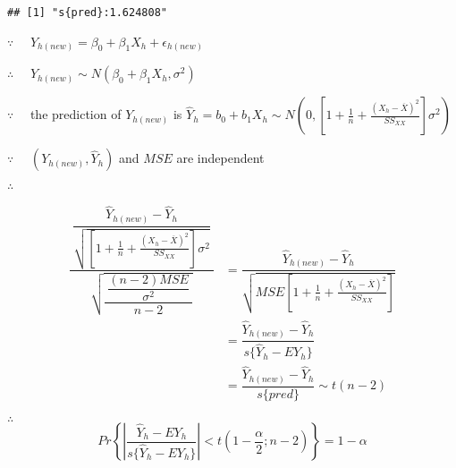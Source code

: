 \documentclass[]{article}
\newenvironment{Shaded}{\begin{snugshade}}{\end{snugshade}}
\newcommand{\KeywordTok}[1]{\textcolor[rgb]{0.13,0.29,0.53}{\textbf{#1}}}
\newcommand{\DataTypeTok}[1]{\textcolor[rgb]{0.13,0.29,0.53}{#1}}
\newcommand{\DecValTok}[1]{\textcolor[rgb]{0.00,0.00,0.81}{#1}}
\newcommand{\FloatTok}[1]{\textcolor[rgb]{0.00,0.00,0.81}{#1}}
\newcommand{\StringTok}[1]{\textcolor[rgb]{0.31,0.60,0.02}{#1}}
\newcommand{\OtherTok}[1]{\textcolor[rgb]{0.56,0.35,0.01}{#1}}
\newcommand{\OperatorTok}[1]{\textcolor[rgb]{0.81,0.36,0.00}{\textbf{#1}}}
\newcommand{\NormalTok}[1]{#1}
\begin{document}
\begin{Shaded}
\end{Shaded}

\begin{verbatim}
## [1] "s{pred}:1.624808"
\end{verbatim}

\(\because\quad\) \(Y_{h(new)}=\beta_0+\beta_1X_h+\epsilon_{h(new)}\)

\(\therefore\quad\) \(Y_{h(new)}\sim N(\beta_0+\beta_1 X_h,\sigma^2)\)

\(\because\quad\) the prediction of \(Y_{h(new)}\) is
\(\hat{Y}_h=b_0+b_1X_h\sim N\left(0,\left[1+\frac{1}{n}+\frac{(X_h-\overline{X})^2}{SS_{XX}}\right]\sigma^2\right)\)

\(\because\quad\) \((Y_{h(new)},\hat{Y}_h)\) and \(MSE\) are independent

\(\therefore\quad\)

\begin{align*}
\dfrac{\ \dfrac{\hat{Y}_{h(new)}-\hat{Y}_h}{\sqrt{\left[1+\frac{1}{n}+\frac{(X_h-\overline{X})^2}{SS_{XX}}\right]\sigma^2}}\ }{\sqrt{\dfrac{\ \dfrac{(n-2)MSE}{\sigma^2}\ }{n-2}}}&=\dfrac{\hat{Y}_{h(new)}-\hat{Y}_h}{\sqrt{MSE\left[1+\frac{1}{n}+\frac{(X_h-\overline{X})^2}{SS_{XX}}\right]}}\\
&=\dfrac{\hat{Y}_{h(new)}-\hat{Y}_h}{s\{\hat{Y}_h-EY_h\}}\\
&=\dfrac{\hat{Y}_{h(new)}-\hat{Y}_h}{s\{pred\}}\sim t(n-2)
\end{align*}

\(\therefore\quad\)
\[Pr\left\{\left|\dfrac{\hat{Y}_h-EY_h}{s\{\hat{Y}_h-EY_h\}}\right|<t(1-\frac{\alpha}{2};n-2)\right\}=1-\alpha\]
\end{document}
